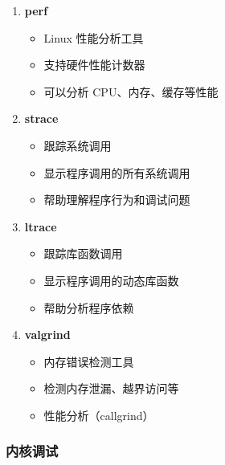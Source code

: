 \begin{enumerate}
  \item \textbf{perf}
    \begin{itemize}
      \item Linux 性能分析工具
      \item 支持硬件性能计数器
      \item 可以分析 CPU、内存、缓存等性能
    \end{itemize}

  \item \textbf{strace}
    \begin{itemize}
      \item 跟踪系统调用
      \item 显示程序调用的所有系统调用
      \item 帮助理解程序行为和调试问题
    \end{itemize}

  \item \textbf{ltrace}
    \begin{itemize}
      \item 跟踪库函数调用
      \item 显示程序调用的动态库函数
      \item 帮助分析程序依赖
    \end{itemize}

  \item \textbf{valgrind}
    \begin{itemize}
      \item 内存错误检测工具
      \item 检测内存泄漏、越界访问等
      \item 性能分析（callgrind）
    \end{itemize}
\end{enumerate}

\subsubsection{内核调试}

